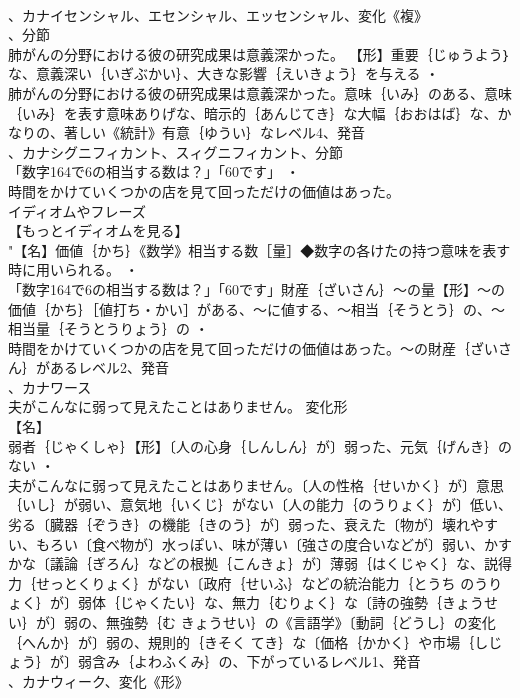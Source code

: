 \documentclass[8pt]{extreport}
\begin{document}
\begin{CJK}{UTF8}{min}
\\	、カナイセンシャル、エセンシャル、エッセンシャル、変化《複》
\\	、分節
\\	肺がんの分野における彼の研究成果は意義深かった。		【形】重要｛じゅうよう｝な、意義深い｛いぎぶかい｝、大きな影響｛えいきょう｝を与える ・
\\	肺がんの分野における彼の研究成果は意義深かった。意味｛いみ｝のある、意味｛いみ｝を表す意味ありげな、暗示的｛あんじてき｝な大幅｛おおはば｝な、かなりの、著しい《統計》有意｛ゆうい｝なレベル4、発音
\\	、カナシグニフィカント、スィグニフィカント、分節
\\	「数字164で6の相当する数は？」「60です」 ・
\\	時間をかけていくつかの店を見て回っただけの価値はあった。
\\	イディオムやフレーズ 
\\	【もっとイディオムを見る】
\\	"【名】価値｛かち｝《数学》相当する数［量］◆数字の各けたの持つ意味を表す時に用いられる。 ・
\\	「数字164で6の相当する数は？」「60です」財産｛ざいさん｝～の量【形】～の価値｛かち｝［値打ち・かい］がある、～に値する、～相当｛そうとう｝の、～相当量｛そうとうりょう｝の ・
\\	時間をかけていくつかの店を見て回っただけの価値はあった。～の財産｛ざいさん｝があるレベル2、発音
\\	、カナワース
\\	夫がこんなに弱って見えたことはありません。	変化形 
\\	【名】
\\	弱者｛じゃくしゃ｝【形】〔人の心身｛しんしん｝が〕弱った、元気｛げんき｝のない ・
\\	夫がこんなに弱って見えたことはありません。〔人の性格｛せいかく｝が〕意思｛いし｝が弱い、意気地｛いくじ｝がない〔人の能力｛のうりょく｝が〕低い、劣る〔臓器｛ぞうき｝の機能｛きのう｝が〕弱った、衰えた〔物が〕壊れやすい、もろい〔食べ物が〕水っぽい、味が薄い〔強さの度合いなどが〕弱い、かすかな〔議論｛ぎろん｝などの根拠｛こんきょ｝が〕薄弱｛はくじゃく｝な、説得力｛せっとくりょく｝がない〔政府｛せいふ｝などの統治能力｛とうち のうりょく｝が〕弱体｛じゃくたい｝な、無力｛むりょく｝な〔詩の強勢｛きょうせい｝が〕弱の、無強勢｛む きょうせい｝の《言語学》〔動詞｛どうし｝の変化｛へんか｝が〕弱の、規則的｛きそく てき｝な〔価格｛かかく｝や市場｛しじょう｝が〕弱含み｛よわふくみ｝の、下がっているレベル1、発音
\\	、カナウィーク、変化《形》

\end{CJK}
\end{document}
